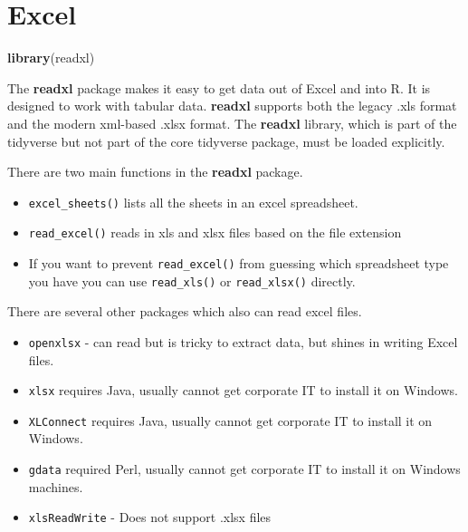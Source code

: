 \documentclass[]{book}
\newenvironment{Shaded}{\begin{snugshade}}{\end{snugshade}}
\newcommand{\KeywordTok}[1]{\textcolor[rgb]{0.13,0.29,0.53}{\textbf{#1}}}
\newcommand{\NormalTok}[1]{#1}
\providecommand{\tightlist}{%
  \setlength{\itemsep}{0pt}\setlength{\parskip}{0pt}}
\newenvironment{rmdblock}[1]
  {\begin{shaded*}
  \begin{itemize}
  \renewcommand{\labelitemi}{
    \raisebox{-.7\height}[0pt][0pt]{
      {\setkeys{Gin}{width=3em,keepaspectratio}\texttt{[image: images/\#1]}}
    }
  }
  \item
  }
  {
  \end{itemize}
  \end{shaded*}
  }
\newenvironment{rmdnote}
  {\begin{rmdblock}{note}}
  {\end{rmdblock}}
\theoremstyle{definition}
\theoremstyle{definition}
\theoremstyle{definition}
\theoremstyle{remark}
\begin{document}
\hypertarget{excel}{%
\section{Excel}\label{excel}}

\begin{Shaded}
\begin{Highlighting}[]
\KeywordTok{library}\NormalTok{(readxl)}
\end{Highlighting}
\end{Shaded}

The \textbf{readxl} package makes it easy to get data out of Excel and
into R. It is designed to work with tabular data. \textbf{readxl}
supports both the legacy .xls format and the modern xml-based .xlsx
format. The \textbf{readxl} library, which is part of the tidyverse but
not part of the core tidyverse package, must be loaded explicitly.

There are two main functions in the \textbf{readxl} package.

\begin{itemize}
\tightlist
\item
  \texttt{excel\_sheets()} lists all the sheets in an excel spreadsheet.
\item
  \texttt{read\_excel()} reads in xls and xlsx files based on the file
  extension
\end{itemize}

\begin{rmdnote}
If you want to prevent \texttt{read\_excel()} from guessing which
spreadsheet type you have you can use \texttt{read\_xls()} or
\texttt{read\_xlsx()} directly.
\end{rmdnote}

There are several other packages which also can read excel files.

\begin{itemize}
\tightlist
\item
  \texttt{openxlsx} - can read but is tricky to extract data, but shines
  in writing Excel files.
\item
  \texttt{xlsx} requires Java, usually cannot get corporate IT to
  install it on Windows.
\item
  \texttt{XLConnect} requires Java, usually cannot get corporate IT to
  install it on Windows.
\item
  \texttt{gdata} required Perl, usually cannot get corporate IT to
  install it on Windows machines.
\item
  \texttt{xlsReadWrite} - Does not support .xlsx files
\end{itemize}
\end{document}
